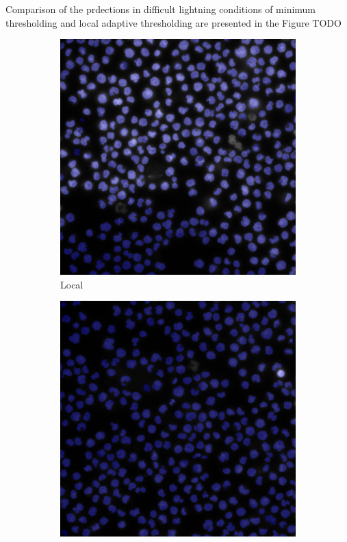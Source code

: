 Comparison of the prdections in difficult lightning conditions of minimum thresholding and local adaptive thresholding are presented in the Figure TODO
\begin{figure}[ht] 
    \begin{subfigure}[b]{0.5\linewidth}
      \centering
      \includegraphics[width=0.75\linewidth]{bilder/difficult-lightning/gradient_local.png} 
      \caption{Local} 
      \label{fig7:a} 
      \vspace{4ex}
    \end{subfigure}%
    \begin{subfigure}[b]{0.5\linewidth}
      \centering
      \includegraphics[width=0.75\linewidth]{bilder/difficult-lightning/point_local.png} 

\end{subfigure}
\end{figure}
